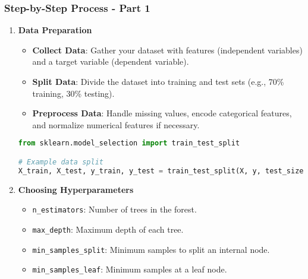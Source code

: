 \documentclass[aspectratio=169]{beamer}
\begin{document}
\begin{frame}[fragile]
    \frametitle{Step-by-Step Process - Part 1}
    \begin{enumerate}
        \item \textbf{Data Preparation}
            \begin{itemize}
                \item \textbf{Collect Data}: Gather your dataset with features (independent variables) and a target variable (dependent variable).
                \item \textbf{Split Data}: Divide the dataset into training and test sets (e.g., 70\% training, 30\% testing).
                \item \textbf{Preprocess Data}: Handle missing values, encode categorical features, and normalize numerical features if necessary.
            \end{itemize}
            \begin{lstlisting}[language=Python]
from sklearn.model_selection import train_test_split

# Example data split
X_train, X_test, y_train, y_test = train_test_split(X, y, test_size=0.3, random_state=42)
            \end{lstlisting}

        \item \textbf{Choosing Hyperparameters}
            \begin{itemize}
                \item \texttt{n\_estimators}: Number of trees in the forest.
                \item \texttt{max\_depth}: Maximum depth of each tree.
                \item \texttt{min\_samples\_split}: Minimum samples to split an internal node.
                \item \texttt{min\_samples\_leaf}: Minimum samples at a leaf node.
            \end{itemize}
    \end{enumerate}
\end{frame}
\end{document}
